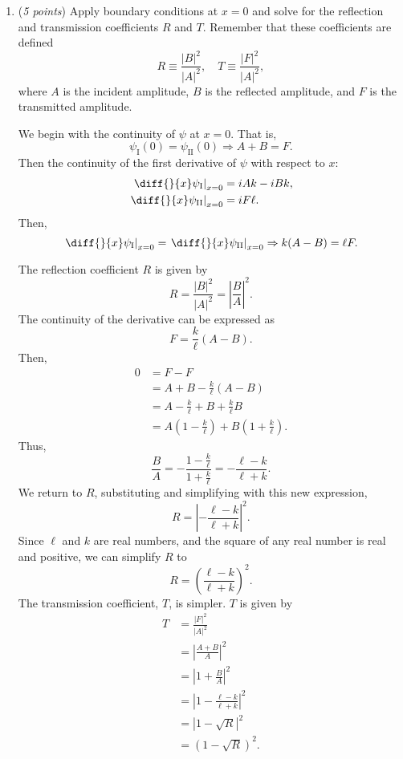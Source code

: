 \documentclass[a4paper, 12pt]{config/homework}
\begin{document}
\begin{enumerate}[label=(\alph*.)]
\vspace{\baselineskip}
\item (\textit{5 points}) Apply boundary conditions at \(x=0\) and solve for the reflection and transmission coefficients \(R\) and \(T\). Remember that these coefficients are defined
\[R \equiv \frac{|B|^2}{|A|^2}, \quad T\equiv\frac{|F|^2}{|A|^2},\]
where \(A\) is the incident amplitude, \(B\) is the reflected amplitude, and \(F\) is the transmitted amplitude.

We begin with the continuity of \(\psi \) at \(x=0\). That is,
\[\psi_\text{I}(0) = \psi_\text{II}(0) \Rightarrow A+B = F.\]
Then the continuity of the first derivative of \(\psi \) with respect to \(x\):
\begin{align*}
\left. \diff{}{x}\psi_\text{I} \right|_{x=0} &= iAk - iBk, \\
\left. \diff{}{x}\psi_\text{II} \right|_{x=0} &= iF\ell.
\end{align*}
Then,
\[\left. \diff{}{x}\psi_\text{I} \right|_{x=0} = \left. \diff{}{x}\psi_\text{II} \right|_{x=0} \Rightarrow k(A-B) = \ell F.\]

The reflection coefficient \(R\) is given by
\[R = \frac{|B|^2}{|A|^2} = \left| \frac{B}{A} \right|^2.\]
The continuity of the derivative can be expressed as
\[F = \frac{k}{\ell}(A-B).\]
Then,
\begin{align*}
0 &= F-F
\\&= A+B - \frac{k}{\ell}(A-B)
\\&= A - \frac{k}{\ell} + B + \frac{k}{\ell}B
\\&= A \left(1 - \frac{k}{\ell}\right) + B\left(1 + \frac{k}{\ell}\right).
\end{align*}
Thus,
\[\frac{B}{A} = - \frac{1-\frac{k}{\ell}}{1 + \frac{k}{\ell}} = - \frac{\ell -k}{\ell + k}.\]
We return to \(R\), substituting and simplifying with this new expression,
\[R = \left| - \frac{\ell - k}{\ell + k} \right|^2.\]
Since \(\ell \) and \(k\) are real numbers, and the square of any real number is real and positive, we can simplify \(R\) to
\[R = \left( \frac{\ell - k}{\ell + k}\right)^2.\]
The transmission coefficient, \(T\), is simpler. \(T\) is given by
\begin{align*}
T &= \frac{|F|^2}{|A|^2}
\\&= \left| \frac{A + B}{A} \right|^2
\\&= \left| 1 + \frac{B}{A} \right|^2
\\&= \left| 1 - \frac{\ell - k}{\ell + k} \right|^2
\\&= \left| 1 - \sqrt{R} \right|^2
\\&= \left( 1 - \sqrt{R} \right)^2.
\end{align*}


\end{enumerate}
\end{document}
